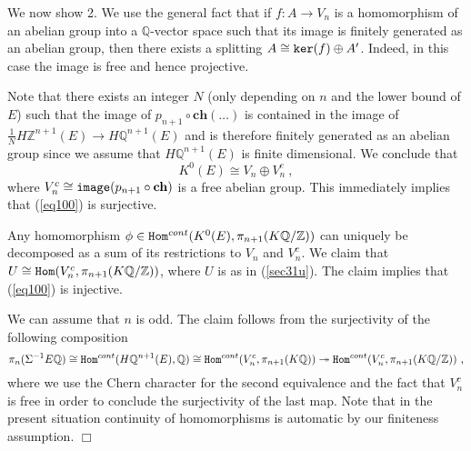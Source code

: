 \documentclass[12pt]{article}
\renewcommand{\ker}{{\tt ker}}
\def\hB{\hspace*{\fill}$\Box$ \newline\noindent}
\newcommand{\Z}{{\mathbb{Z}}}
\newcommand{\Q}{{\mathbb{Q}}}
\newcommand{\image}{{\tt image}}
\newcommand{\Hom}{{\tt Hom}}
\newcommand{\ch}{{\mathbf{ch}}}
\begin{document}
We now show 2.  We use the general fact that if $f:A\to V_{n}$ is a homomorphism of an abelian group into  a $\Q$-vector space such that its image is finitely generated as an abelian group, then there exists a splitting $A\cong \ker(f)\oplus A^{\prime}$. Indeed, in this case the image is free and hence projective.

Note that there exists an integer $N$ (only depending on $n$ and the lower bound of $E$) such that the image of 
$p_{n+1}\circ  \ch(\dots)$ is contained in the image of $\frac{1}{N} H\Z^{n+1}(E)\to  H\Q^{n+1}(E)$ and is therefore finitely generated as an abelian group since we assume that $H\Q^{n+1}(E)$ is finite dimensional. We conclude that $$K^{0}(E)\cong V_{n}\oplus V_{n}^{c}\ ,$$
where $V_{n}^{c}\cong \image(p_{n+1}\circ  \ch)$ is a free abelian group.
This immediately implies that (\ref{eq100}) is surjective.

Any homomorphism
$\phi\in \Hom^{cont}(K^{0}(E),\pi_{n+1}(K\Q/\Z))$
 can uniquely be decomposed as a sum of its restrictions to $V_{n}$  and $V_{n}^{c}$.
  We claim that $U\cong \Hom(V_{n}^{c},\pi_{n+1}(K\Q/\Z))$, where $U$ is as in (\ref{sec31u}). 
 The claim implies that (\ref{eq100}) is injective.  
 
 We can assume that $n$ is odd.
 The claim follows  from the surjectivity of the following composition
 $$\pi_{n}(\Sigma^{-1}E\Q)\cong \Hom^{cont}(H\Q^{n+1}(E),\Q)\cong \Hom^{cont}(V_{n}^{c},\pi_{n+1}(K\Q))\twoheadrightarrow \Hom^{cont}(V_{n}^{c},\pi_{n+1}(K\Q/\Z))\ , $$
 where we use the Chern character  for the second equivalence and the fact that $V_{n}^{c}$ is free
 in order to conclude the surjectivity of the last map. Note that in the present situation continuity of homomorphisms is automatic by our finiteness assumption.
\hB 
\end{document}
